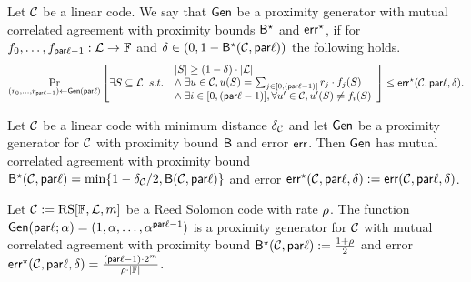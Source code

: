 \begin{definition}\label{def:gen_mutual_corr_agreement}
    Let $\mathcal{C}$ be a linear code. We say that $\mathsf{Gen}$ be a proximity generator with mutual correlated agreement with proximity bounds ${\mathsf{B}}^\star$ and $\mathsf{err}^\star$, if for $f_0,\ldots,f_{\mathsf{par}\ell-1}:\mathcal{L}\rightarrow\mathbb{F}$ and $\delta\in(0,1-{\mathsf{B}}^\star(\mathcal{C},\mathsf{par}\ell))$ the following holds.
    \[
    \Pr_{(r_0, \ldots, r_{\mathsf{par}\ell-1}) \leftarrow \mathsf{Gen}(\mathsf{par}\ell)} \left[
        \exists S \subseteq \mathcal{L} \;\; s.t.\;\;
        \begin{array}{l}
        |S| \geq (1 - \delta) \cdot |\mathcal{L}| \\
        \land\; \exists u \in \mathcal{C}, u(S) = \sum_{j \in [0,(\mathsf{par}\ell-1)]} r_j \cdot f_j(S) \\
        \land\; \exists i \in [0,(\mathsf{par}\ell-1)], \forall u' \in \mathcal{C}, u'(S) \neq f_i(S)
        \end{array}\right]
    \leq \mathsf{err}^\star(\mathcal{C}, \mathsf{par}\ell, \delta).
    \]
\end{definition}

\begin{lemma}\label{lemma:gen_mutual_corr_agreement}
    Let $\mathcal{C}$ be a linear code with minimum distance $\delta_{\mathcal{C}}$ and let $\mathsf{Gen}$ be a proximity generator for $\mathcal{C}$ with proximity bound ${\mathsf{B}}$ and error $\mathsf{err}$. Then $\mathsf{Gen}$ has mutual correlated agreement with proximity bound ${\mathsf{B}}^\star(\mathcal{C}, \mathsf{par}\ell) = \min\{1 - \delta_{\mathcal{C}}/2, \mathsf{B}(\mathcal{C}, \mathsf{par}\ell)\}$ and error $\mathsf{err}^\star(\mathcal{C}, \mathsf{par}\ell, \delta) := \mathsf{err}(\mathcal{C}, \mathsf{par}\ell, \delta)$.
\end{lemma}

\begin{lemma}
    Let $\mathcal{C} := \mathrm{RS}[\mathbb{F}, \mathcal{L}, m]$ be a Reed Solomon code with rate $\rho$. The function $\mathsf{Gen}(\mathsf{par}\ell; \alpha) = (1, \alpha, \ldots, \alpha^{\mathsf{par}\ell - 1})$ is a proximity generator for $\mathcal{C}$ with mutual correlated agreement with proximity bound ${\mathsf{B}}^\star(\mathcal{C}, \mathsf{par}\ell) := \frac{1 + \rho}{2}$ and error $\mathsf{err}^\star(\mathcal{C}, \mathsf{par}\ell, \delta) = \frac{(\mathsf{par}\ell - 1) \cdot 2^m}{\rho \cdot |\mathbb{F}|}$.
\end{lemma}

